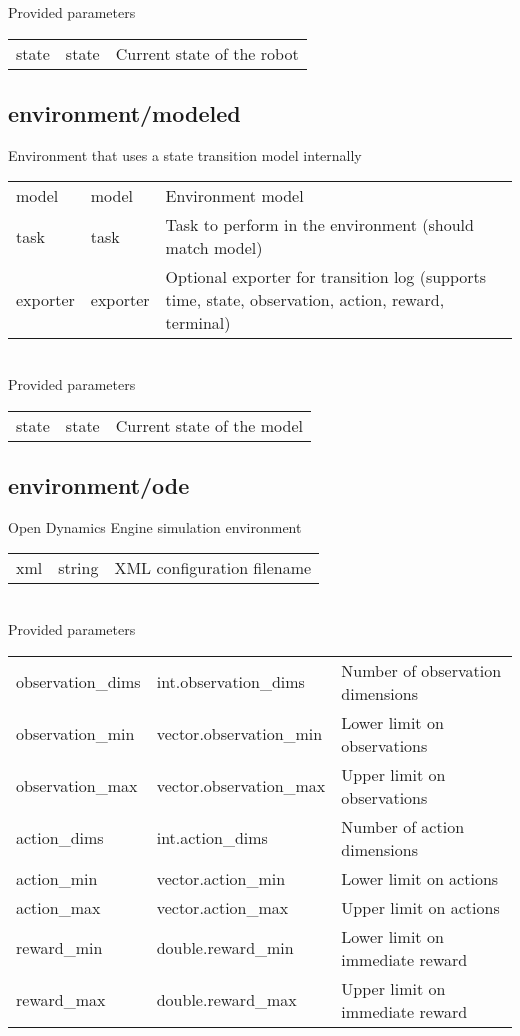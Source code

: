 \noindent Provided parameters\\

\noindent\begin{tabular}{@{}lll@{}}
state&state&Current state of the robot\\
\end{tabular}
\subsection{environment/modeled}
\noindent Environment that uses a state transition model internally\\

\noindent\begin{tabular}{@{}lll@{}}
model&model&Environment model\\
task&task&Task to perform in the environment (should match model)\\
exporter&exporter&Optional exporter for transition log (supports time, state, observation, action, reward, terminal)\\
\end{tabular}
\\

\noindent Provided parameters\\

\noindent\begin{tabular}{@{}lll@{}}
state&state&Current state of the model\\
\end{tabular}
\subsection{environment/ode}
\noindent Open Dynamics Engine simulation environment\\

\noindent\begin{tabular}{@{}lll@{}}
xml&string&XML configuration filename\\
\end{tabular}
\\

\noindent Provided parameters\\

\noindent\begin{tabular}{@{}lll@{}}
observation\_dims&int.observation\_dims&Number of observation dimensions\\
observation\_min&vector.observation\_min&Lower limit on observations\\
observation\_max&vector.observation\_max&Upper limit on observations\\
action\_dims&int.action\_dims&Number of action dimensions\\
action\_min&vector.action\_min&Lower limit on actions\\
action\_max&vector.action\_max&Upper limit on actions\\
reward\_min&double.reward\_min&Lower limit on immediate reward\\
reward\_max&double.reward\_max&Upper limit on immediate reward\\
\end{tabular}
